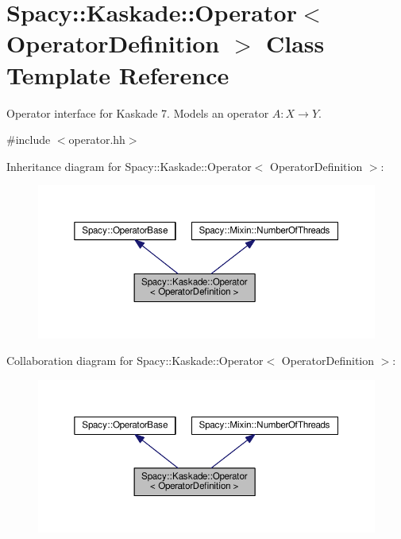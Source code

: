 \hypertarget{classSpacy_1_1Kaskade_1_1Operator}{}\section{Spacy\+:\+:Kaskade\+:\+:Operator$<$ Operator\+Definition $>$ Class Template Reference}
\label{classSpacy_1_1Kaskade_1_1Operator}


Operator interface for Kaskade 7. Models an operator $A:X\rightarrow Y$.  




{\ttfamily \#include $<$operator.\+hh$>$}



Inheritance diagram for Spacy\+:\+:Kaskade\+:\+:Operator$<$ Operator\+Definition $>$\+:\nopagebreak
\begin{figure}[H]
\begin{center}
\leavevmode
\includegraphics[width=350pt]{classSpacy_1_1Kaskade_1_1Operator__inherit__graph}
\end{center}
\end{figure}


Collaboration diagram for Spacy\+:\+:Kaskade\+:\+:Operator$<$ Operator\+Definition $>$\+:\nopagebreak
\begin{figure}[H]
\begin{center}
\leavevmode
\includegraphics[width=350pt]{classSpacy_1_1Kaskade_1_1Operator__coll__graph}
\end{center}
\end{figure}

